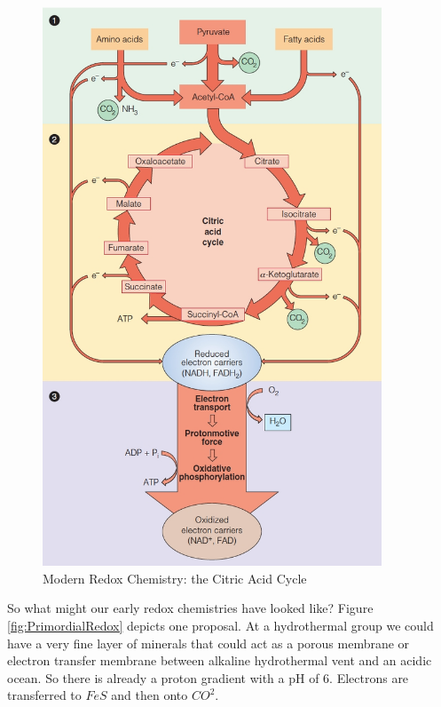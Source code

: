 \documentclass[]{article}
\begin{document}
\begin{figure}[H]
	\caption{Modern Redox Chemistry: the Citric Acid Cycle} \label{fig:ModernRedox} 
	\includegraphics[width=0.9\textwidth]{ModernRedox}
\end{figure}

So what might our early redox chemistries have looked like? Figure \ref{fig:PrimordialRedox} \cite{sojo2016origin} depicts one proposal. At a hydrothermal group we could have a very fine layer of minerals that could act as a porous membrane or electron transfer membrane between alkaline hydrothermal vent and an acidic ocean. So there is already a proton gradient with a pH of 6. Electrons are transferred to $FeS$ and then onto $CO^2$. 
\end{document}
